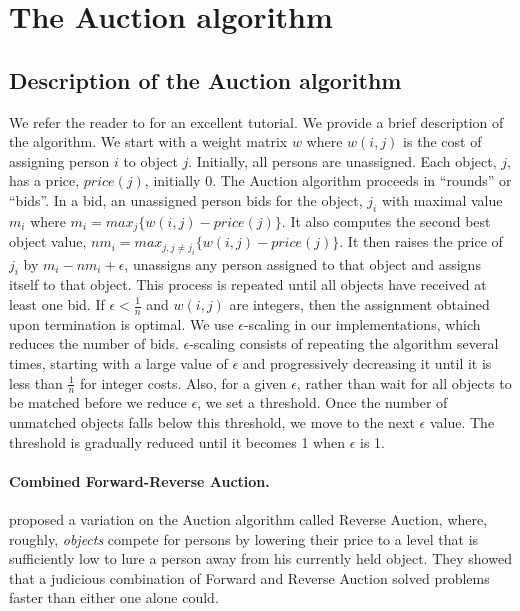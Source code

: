 \section{The Auction algorithm}
\label{auction}

\subsection{Description of the Auction algorithm}
\label{auction_desc}
We refer the reader to \cite{be91} for an excellent tutorial.
We provide a brief description of the algorithm.
We start with a weight matrix $w$ where $w(i, j)$ is the cost
of assigning person $i$ to object $j$. Initially, all persons
are unassigned. Each object, $j$, has a price, $price(j)$, initially 0.
The Auction algorithm proceeds in ``rounds'' or ``bids''.
In a bid, an unassigned person bids for the object, $j_i$ with maximal
value $m_i$ where $m_i = max_j \{w(i, j) - price(j) \}$.
It also computes the second best object value,
$nm_i = max_{j, j \neq j_i} \{ w(i, j) - price(j) \} $.
It then raises the price of $j_i$ by $m_i - {nm}_i + \epsilon$,
unassigns any person assigned to that object and
assigns itself to that object.  This process is repeated 
until all objects have received at least one bid.
If $\epsilon < \frac{1}{n}$ and $w(i, j)$ are integers, then the
assignment obtained upon termination  is optimal.
We use $\epsilon$-scaling in our implementations,
which reduces the number of bids.
$\epsilon$-scaling consists of repeating the algorithm several
times, starting with a large value of $\epsilon$ and progressively
decreasing it until it is less than $\frac{1}{n}$ for integer costs.
Also, for a given $\epsilon$, rather than wait for all objects
to be matched before we reduce $\epsilon$, we set a threshold.
Once the number of unmatched objects falls below this threshold,
we move to the next $\epsilon$ value. The threshold
is gradually reduced until it becomes 1 when $\epsilon$ is 1.

\paragraph{Combined Forward-Reverse Auction.}
\cite{bct91} proposed a variation on the Auction algorithm
called Reverse Auction, where, roughly, {\em objects} compete for persons
by lowering their price to a level that is sufficiently low to lure a person
away from his currently held object. They showed that a judicious
combination of Forward and Reverse Auction solved problems faster
than either one alone could.

